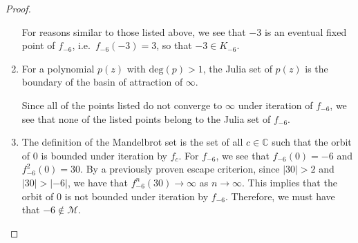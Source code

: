 \begin{proof}
\begin{enumerate}
      For reasons similar to those listed above, we see that $-3$ is an eventual fixed point of
      $f_{-6}$, i.e.\ $f_{-6}(-3) = 3$, so that $-3 \in K_{-6}$.

    \item For a polynomial $p(z)$ with $\text{deg}(p) > 1$, the Julia
      set of $p(z)$ is the boundary of the basin of attraction of $\infty$.

      Since all of the points listed do not converge to $\infty$ under iteration of $f_{-6}$,
      we see that none of the listed points belong to the Julia set of $f_{-6}$.

    \item The definition of the Mandelbrot set
      is the set of all $c \in \mathbb{C}$ such that the orbit of 0 is bounded under iteration by $f_{c}$.
      For $f_{-6}$, we see that $f_{-6}(0) = -6$ and $f_{-6}^2(0) = 30$. By a previously proven escape criterion,
      since $|30| > 2$ and $|30| > |-6|$, we have that $f_{-6}^n(30) \to \infty$ as $n \to \infty$.
      This implies that the orbit of $0$ is not bounded under iteration by $f_{-6}$. Therefore,
      we must have that $-6 \notin \mathcal{M}$.
  \end{enumerate}
\end{proof}
\newpage
